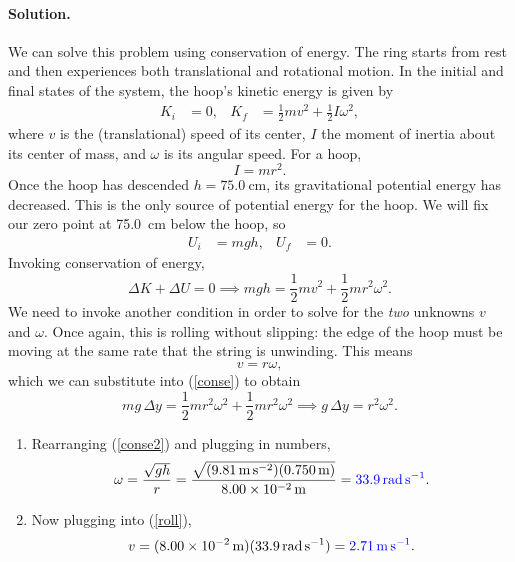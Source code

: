\documentclass[11pt]{article}
\newcommand{\refeq}[1]{(\ref{#1})}
\newcommand{\beq}{\begin{equation*}}
\newcommand{\eeq}{\end{equation*}}
\newcommand{\beqn}{\begin{equation}}
\newcommand{\eeqn}{\end{equation}}
\newenvironment{solution}
{
    \paragraph{Solution.}
    \ignorespaces
}
{
    \bigskip
}
\begin{document}
\begin{solution}
	We can solve this problem using conservation of energy.  The ring starts from rest and then experiences both translational and rotational motion.  In the initial and final states of the system, the hoop's kinetic energy is given by
	\begin{align*}
		K_i &= 0, &
		K_f &= \frac{1}{2} m v^2 + \frac{1}{2} I \omega^2,
	\end{align*}
	where $v$ is the (translational) speed of its center, $I$ the moment of inertia about its center of mass, and $\omega$ is its angular speed.  For a hoop,
	\beq
		I = m r^2.
	\eeq
	Once the hoop has descended $h = \SI{75.0}{\centi\meter}$, its gravitational potential energy has decreased.  This is the only source of potential energy for the hoop.  We will fix our zero point at \SI{75.0}{\cm} below the hoop, so
	\begin{align*}
		U_i &= mg h, &
		U_f &= 0.
	\end{align*}
	Invoking conservation of energy,
	\beqn \label{conse}
		\Delta K + \Delta U = 0 \implies mg h = \frac{1}{2} m v^2 + \frac{1}{2} m r^2 \omega^2.
	\eeqn
	We need to invoke another condition in order to solve for the \emph{two} unknowns $v$ and $\omega$.  Once again, this is rolling without slipping: the edge of the hoop must be moving at the same rate that the string is unwinding.  This means
	\beqn \label{roll}
		v = r \omega,
	\eeqn
	which we can substitute into \refeq{conse} to obtain
	\beqn \label{conse2}
		mg \,\Delta y = \frac{1}{2} m r^2 \omega^2 + \frac{1}{2} m r^2 \omega^2 \implies g \,\Delta y = r^2 \omega^2.
	\eeqn
	
	\begin{enumerate}
		\item Rearranging \refeq{conse2} and plugging in numbers,
			\beq
				\omega = \frac{\sqrt{g h}}{r} = \frac{\sqrt{(\sig) (\SI{0.750}{\meter})}}{\SI{8.00e-2}{\meter}} = {\color{blue} \SI{33.9}{\radian\per\second}}.
			\eeq
			
		\item Now plugging into \refeq{roll},
			\beq
				v = (\SI{8.00e-2}{\meter}) (\SI{33.9}{\radian\per\second}) = {\color{blue} \SI{2.71}{\meter\per\second}}.
			\eeq
	\end{enumerate}
\end{solution}
\end{document}
